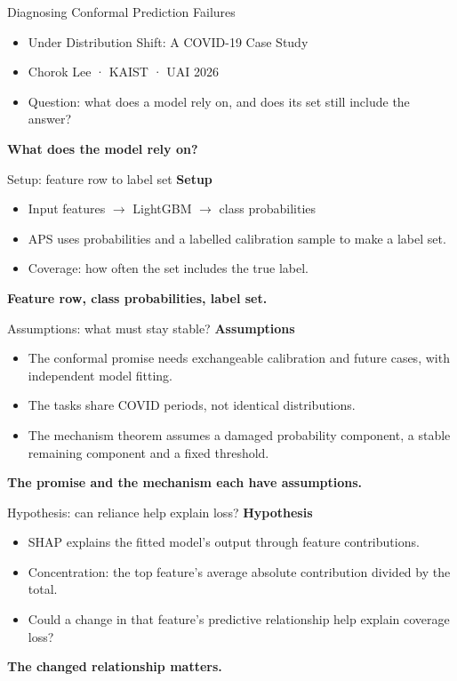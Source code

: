 \documentclass[aspectratio=43,10pt]{beamer}
\newcommand{\deckstage}[2]{{\scriptsize\color{pgrey}#2\hfill\color{dred}\textbf{#1}}\par\vspace{0.18cm}}
\newcommand{\deckpoint}[1]{\vfill{\small\color{dred}\textbf{#1}}\par}
\begin{document}
\begin{frame}[t]{Diagnosing Conformal Prediction Failures}
\begin{itemize}
\item Under Distribution Shift: A COVID-19 Case Study
\item Chorok Lee · KAIST · UAI 2026
\item Question: what does a model rely on, and does its set still include the answer?
\end{itemize}
\deckpoint{What does the model rely on?}
\end{frame}
\begin{frame}[t]{Setup: feature row to label set}
\deckstage{Setup}{}
\begin{itemize}
\item Input features $\rightarrow$ LightGBM $\rightarrow$ class probabilities
\item APS uses probabilities and a labelled calibration sample to make a label set.
\item Coverage: how often the set includes the true label.
\end{itemize}
\deckpoint{Feature row, class probabilities, label set.}
\end{frame}
\begin{frame}[t]{Assumptions: what must stay stable?}
\deckstage{Assumptions}{}
\begin{itemize}
\item The conformal promise needs exchangeable calibration and future cases, with independent model fitting.
\item The tasks share COVID periods, not identical distributions.
\item The mechanism theorem assumes a damaged probability component, a stable remaining component and a fixed threshold.
\end{itemize}
\deckpoint{The promise and the mechanism each have assumptions.}
\end{frame}
\begin{frame}[t]{Hypothesis: can reliance help explain loss?}
\deckstage{Hypothesis}{}
\begin{itemize}
\item SHAP explains the fitted model’s output through feature contributions.
\item Concentration: the top feature’s average absolute contribution divided by the total.
\item Could a change in that feature’s predictive relationship help explain coverage loss?
\end{itemize}
\deckpoint{The changed relationship matters.}
\end{frame}
\end{document}
